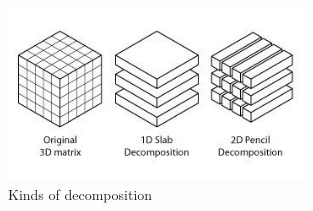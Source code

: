 \begin{figure}
\begin{center}
\includegraphics[width=0.7\textwidth]{grafici/decomp_example}
\caption{Kinds of decomposition}
\label{decomposition:example}
\end{center}
\end{figure}




